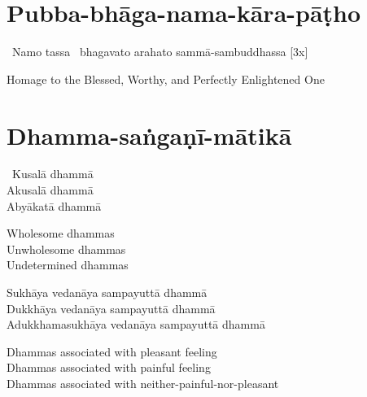 \section{Pubba-bhāga-nama-kāra-pāṭho}
\label{pubba-bhaga-nama-kara-patho}

\vspace{-0.85em}

\anglebracketleft\ \hspace{-0.5mm}Namo tassa \hspace{-0.5mm}\anglebracketright\ bhagavato arahato sammā-sambuddhassa \hfill{[3x]}

\begin{english}
  Homage to the Blessed, Worthy, and Perfectly Enlightened One
\end{english}

\vspace{1em}

\section{Dhamma-saṅgaṇī-mātikā}
\label{dhamma-sangani-matika}

\vspace{-0.8em}

\begin{pali-hang}
\anglebracketleft\ \hspace{-0.5mm}Kusalā dhammā \hspace{-0.5mm}\anglebracketright\ \\
Akusalā dhammā\\
Abyākatā dhammā
\end{pali-hang}

\begin{english-verses}
  Wholesome dhammas\\
  Unwholesome dhammas\\
  Undetermined dhammas
\end{english-verses}

\begin{pali-hang-continued}
Sukhāya vedanāya sampayuttā dhammā\\
Dukkhāya vedanāya sampayuttā dhammā\\
Adukkhamasukhāya vedanāya sampayuttā dhammā
\end{pali-hang-continued}

\begin{english-verses}
  Dhammas associated with pleasant feeling\\
  Dhammas associated with painful feeling\\
  Dhammas associated with neither-painful-nor-pleasant
\end{english-verses}

